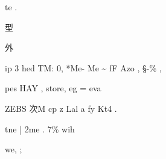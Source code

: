 \documentclass[UTF8,12pt,a4paper,openany]{ctexbook}
\begin{document}
\begin{enumerate}[label=\textbf{\arabic*.},leftmargin=2em]
te .\par 型\par 外\par ip 3 hed TM: 0, *Me- Me \textasciitilde{} fF Azo , §-\% ,\par pes HAY , store, eg = eva\par ZEBS 次M cp z Lal a fy Kt4                .\par tne | 2me .     7\% wih\par we,        ;
\end{enumerate}
\end{document}
